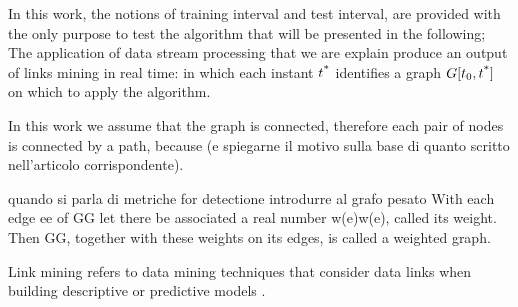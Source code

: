In this work, the notions of training interval and test interval, are provided with the only purpose to test the algorithm that will be presented in the following; The application of data stream processing that we are explain produce an output of links mining in real time: in which each instant $t\textsuperscript{*}$ identifies a graph $G[t_{0},t\textsuperscript{*}]$ on which to apply the algorithm.



In this work we assume that the graph is connected, therefore each pair of nodes is connected by a path, because  (e spiegarne il motivo sulla base di quanto scritto nell'articolo corrispondente).

quando si parla di metriche for detectione introdurre al grafo pesato With each edge ee of GG let there be associated a real number w(e)w(e), called its weight. Then GG, together with these weights on its edges, is called a weighted graph.

Link mining refers to data mining techniques that consider data links when building descriptive or predictive models \cite{getoor2005link}.
